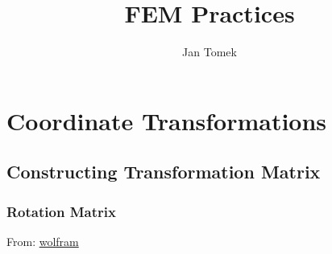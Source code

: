 \documentclass[10pt,b5paper,titlepage]{book}
\author{Jan Tomek}
\title{\bf FEM Practices}
\begin{document}
\maketitle

\tableofcontents


\newpage
\chapter{Coordinate Transformations}

\section{Constructing Transformation Matrix}

\subsection{Rotation Matrix}

From: \href{https://mathworld.wolfram.com/RotationMatrix.html}{wolfram}
\end{document}
